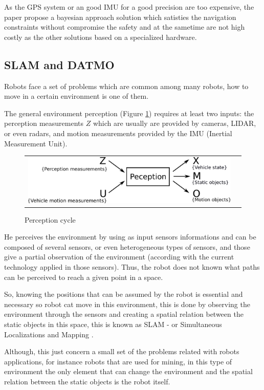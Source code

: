 As the GPS system or an good IMU for a good precision are too expensive, the paper propose a bayesian approach solution which satisties the navigation constraints without compromise the safety and at the sametime are not high costly as the other solutions based on a specialized hardware.

\subsection{SLAM and DATMO}

Robots face a set of problems which are common among many robots, how to move in a certain environment is one of them.

The general environment perception (Figure \ref{fig:perception:cycle}) requires at least two inputs: the perception measurements $Z$ which are usually are provided by cameras, LIDAR, or even radars, and motion measurements provided by the IMU (Inertial Measurement Unit).

\begin{figure}[h]
   \centering
     \begin{tabular}{lr}
       \includegraphics[scale=0.5]{img/fig:perception:cycle}
     \end{tabular}
   \caption{Perception cycle}
   \label{fig:perception:cycle}
 \end{figure}


He perceives the environment by using as input sensors informations and can be composed of several sensors, or even heterogeneous types of sensors, and those give a partial observation of the environment (according with the current technology applied in those sensors). Thus, the robot does not known what paths can be perceived to reach a given point in a space.

So, knowing the positions that can be assumed by the robot is essential and necessary so robot cat move in this environment, this is done by observing the environment through the sensors and creating a spatial relation between the static objects in this space, this is known as SLAM - or Simultaneous Localizations and Mapping \cite{iyengar1991autonomous}.

Although, this just concern a small set of the problems related with robots applications, for instance robots that are used for mining, in this type of environment the only element that can change the environment and the spatial relation between the static objects is the robot itself. 

